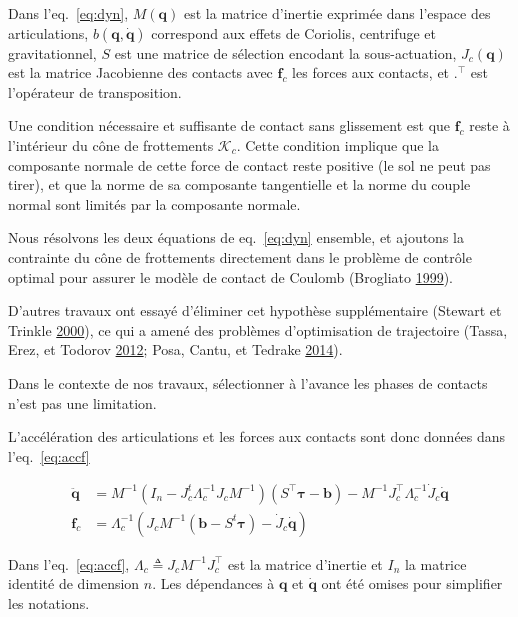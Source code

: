\documentclass[french,A4paper,]{book}
\begin{document}
Dans l'eq.~\ref{eq:dyn}, \(M(\bm q)\) est la matrice d'inertie exprimée
dans l'espace des articulations, \(b(\bm q, \bm{\dot q})\) correspond
aux effets de Coriolis, centrifuge et gravitationnel, \(S\) est une
matrice de sélection encodant la sous-actuation, \(J_c(\bm q)\) est la
matrice Jacobienne des contacts avec \(\bm f_c\) les forces aux
contacts, et \(.^\top\) est l'opérateur de transposition.

Une condition nécessaire et suffisante de contact sans glissement est
que \(\bm f_c\) reste à l'intérieur du cône de frottements
\(\mathcal{K}_c\). Cette condition implique que la composante normale de
cette force de contact reste positive (le sol ne peut pas tirer), et que
la norme de sa composante tangentielle et la norme du couple normal sont
limités par la composante normale.

Nous résolvons les deux équations de eq.~\ref{eq:dyn} ensemble, et
ajoutons la contrainte du cône de frottements directement dans le
problème de contrôle optimal pour assurer le modèle de contact de
Coulomb (Brogliato \protect\hyperlink{ref-brogliato99}{1999}).

D'autres travaux ont essayé d'éliminer cet hypothèse supplémentaire
(Stewart et Trinkle \protect\hyperlink{ref-stewart00}{2000}), ce qui a
amené des problèmes d'optimisation de trajectoire (Tassa, Erez, et
Todorov \protect\hyperlink{ref-tassa12}{2012}; Posa, Cantu, et Tedrake
\protect\hyperlink{ref-posa14}{2014}).

Dans le contexte de nos travaux, sélectionner à l'avance les phases de
contacts n'est pas une limitation.

L'accélération des articulations et les forces aux contacts sont donc
données dans l'eq.~\ref{eq:accf}

\begin{equation}\begin{aligned}
    \bm{\ddot q} &= M^{-1}(I_n - J_c^t\Lambda_c^{-1}J_cM^{-1})(S^\top\bm\tau-\bm b) -
    M^{-1}J_c^\top\Lambda_c^{-1}\dot J_c\bm{\dot q} \\
    \bm f_c &=\Lambda_c^{-1}\left(J_cM^{-1}(\bm b-S^t\bm \tau)-\dot J_c \bm{\dot q}\right)
\end{aligned} \label{eq:accf}\end{equation}

Dans l'eq.~\ref{eq:accf}, \(\Lambda_c \triangleq J_cM^{-1}J_c^\top\) est
la matrice d'inertie et \(I_n\) la matrice identité de dimension \(n\).
Les dépendances à \(\bm q\) et \(\bm{\dot q}\) ont été omises pour
simplifier les notations.
\end{document}

